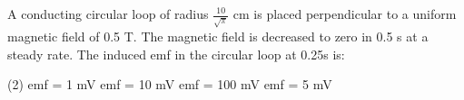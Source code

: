 \item A conducting circular loop of radius $\frac{10}{\sqrt{\pi}}$ cm is placed perpendicular to a uniform magnetic field of 0.5 T. The magnetic field is decreased to zero in 0.5 s at a steady rate. The induced emf in the circular loop at 0.25s is:
    \begin{tasks}(2)
        \task emf = 1 mV
        \task emf = 10 mV
        \task emf = 100 mV
        \task emf = 5 mV
    \end{tasks}